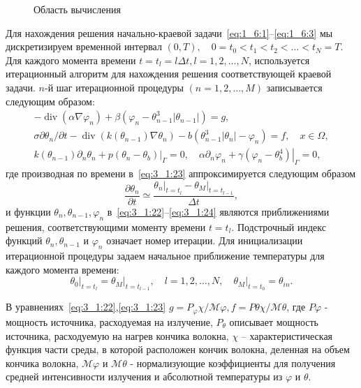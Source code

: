 \begin{figure}[h!t]
    \caption{Область вычисления}
    \label{fig:4_3:3}
\end{figure}
Для нахождения решения начально-краевой
задачи~\eqref{eq:1_6:1}--\eqref{eq:1_6:3}
мы дискретизируем временной интервал
$(0, T), \quad 0=t_{0}<t_{1}<t_{2}<\ldots<t_{N}=T$.
Для каждого момента времени $t=t_{l}=l \Delta t, l=1,2, \ldots, N$,
используется итерационный алгоритм для нахождения решения соответствующей
краевой задачи. $n$-й шаг итерационной процедуры $(n=1,2, \ldots, M)$
записывается следующим образом:
\begin{gather}
    -\operatorname{div}\left(\alpha \nabla \varphi_{n}\right)
    +\beta\left(\varphi_{n}-\theta_{n-1}^{3}
    \left|\theta_{n-1}\right|\right)=g, \label{eq:3_1:22}\\
    \sigma \partial \theta_{n} / \partial t
    -\operatorname{div}\left(k\left(\theta_{n-1}\right)
    \nabla \theta_{n}\right)
    -b\left(\theta_{n-1}^{3}\left|\theta_{n}\right|
    -\varphi_{n}\right)=f, \quad x \in \Omega, \label{eq:3_1:23}\\
    k\left(\theta_{n-1}\right) \partial_{n} \theta_{n}
    +\left.p\left(\theta_{n}-\theta_{b}\right)\right|_{\Gamma}=0,
    \quad \alpha \partial_{n} \varphi_{n}+\left.\gamma
    \left(\varphi_{n}-\theta_{b}^{4}\right)\right|_{\Gamma}=0,\label{eq:3_1:24}
\end{gather}
где производная по времени в~\eqref{eq:3_1:23}
аппроксимируется следующим образом
\[
    \frac{\partial \theta_{n}}{\partial t} \simeq
    \frac{
        \left.\theta_{n}\right|_{t=t_{l}}
        -\left.\theta_{M}\right|_{t=t_{l-1}}
    }{\Delta t},
\]
и функции $\theta_{n}, \theta_{n-1}, \varphi_{n}$
в~\eqref{eq:3_1:22}--\eqref{eq:3_1:24} являются приближениями решения,
соответствующими моменту времени $t=t_{l}$.
Подстрочный индекс функций
$\theta_{n}, \theta_{n-1}$ и $\varphi_{n}$ означает номер итерации.
Для инициализации итерационной процедуры задаем начальное приближение
температуры для каждого момента времени:
\begin{equation}
    \label{eq:3_1:25}
    \left.\theta_{0}\right|_{t=t_{l}}=
    \left.\theta_{M}\right|_{t=t_{l-1}},
    \quad l=1,2, \ldots, N, \left.\quad
    \theta_{M}\right|_{t=t_{0}}=\theta_{i n}.
\end{equation}

В уравнениях~\eqref{eq:3_1:22},\eqref{eq:3_1:23}
$g=P_{\varphi} \chi / \mathcal{M}{\varphi},
f=P{\theta} \chi / \mathcal{M}{\theta}$,
где $P{\varphi}$ - мощность источника, расходуемая на излучение,
$P_{\theta}$ описывает мощность источника, расходуемую на нагрев
кончика волокна, $\chi$ -- характеристическая функция части среды,
в которой расположен кончик волокна, деленная на объем кончика волокна,
$\mathcal{M}{\varphi}$ и $\mathcal{M}{\theta}$ - нормализующие коэффициенты
для получения средней интенсивности излучения
и абсолютной температуры из $\varphi$ и $\theta$.

